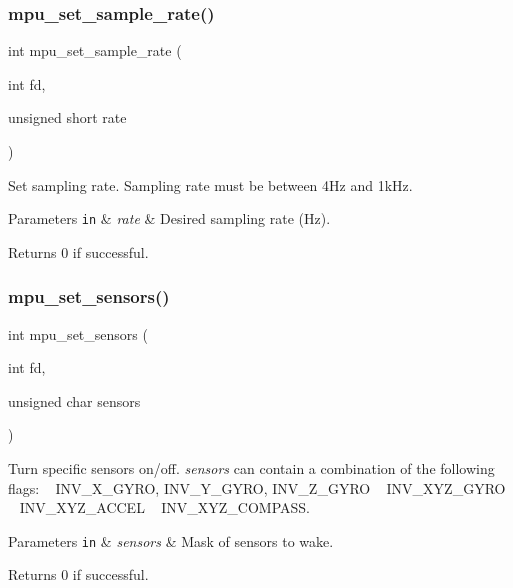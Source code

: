 \subsubsection{mpu\+\_\+set\+\_\+sample\+\_\+rate()}
{\footnotesize\ttfamily int mpu\+\_\+set\+\_\+sample\+\_\+rate (\begin{DoxyParamCaption}\item[{int}]{fd,  }\item[{unsigned short}]{rate }\end{DoxyParamCaption})}



Set sampling rate. Sampling rate must be between 4\+Hz and 1k\+Hz. 


\begin{DoxyParams}[1]{Parameters}
\mbox{\tt in}  & {\em rate} & Desired sampling rate (Hz). \\
\hline
\end{DoxyParams}
\begin{DoxyReturn}{Returns}
0 if successful. 
\end{DoxyReturn}
\mbox{\label{group___d_r_i_v_e_r_s_ga1ffe6d5beda1c4d3d3be27a36a854456}} 
\subsubsection{mpu\+\_\+set\+\_\+sensors()}
{\footnotesize\ttfamily int mpu\+\_\+set\+\_\+sensors (\begin{DoxyParamCaption}\item[{int}]{fd,  }\item[{unsigned char}]{sensors }\end{DoxyParamCaption})}



Turn specific sensors on/off. {\itshape sensors} can contain a combination of the following flags\+: ~\newline
 I\+N\+V\+\_\+\+X\+\_\+\+G\+Y\+RO, I\+N\+V\+\_\+\+Y\+\_\+\+G\+Y\+RO, I\+N\+V\+\_\+\+Z\+\_\+\+G\+Y\+RO ~\newline
 I\+N\+V\+\_\+\+X\+Y\+Z\+\_\+\+G\+Y\+RO ~\newline
 I\+N\+V\+\_\+\+X\+Y\+Z\+\_\+\+A\+C\+C\+EL ~\newline
 I\+N\+V\+\_\+\+X\+Y\+Z\+\_\+\+C\+O\+M\+P\+A\+SS. 


\begin{DoxyParams}[1]{Parameters}
\mbox{\tt in}  & {\em sensors} & Mask of sensors to wake. \\
\hline
\end{DoxyParams}
\begin{DoxyReturn}{Returns}
0 if successful. 
\end{DoxyReturn}
\mbox{\label{group___d_r_i_v_e_r_s_ga0fede4e095c7687cfeaf4187904f9698}} 
